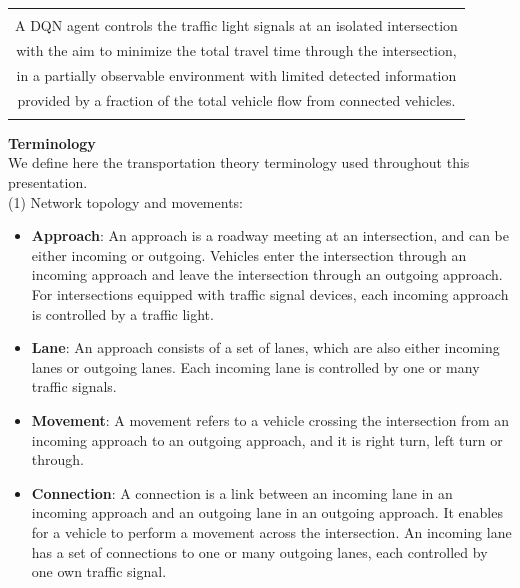 \begin{table}[htbp]
\centering
\setlength\tabcolsep{2pt}
\begin{tabular}{|c|}
\hline
\\
\:\:A DQN agent controls the traffic light signals at an isolated intersection\:\:\\
\:\:with the aim to minimize the total travel time through the intersection,\:\:\\
\:\:in a partially observable environment with limited detected information\:\:\\
\:\:provided by a fraction of the total vehicle flow from connected vehicles.\:\:\\
\\
\hline
\end{tabular}
\end{table}

\textbf{Terminology} \\
We define here the transportation theory terminology used throughout this presentation. \\

(1) Network topology and movements:
\begin{itemize}
\setlength\itemsep{-0.5em}
  \item \textbf{Approach}: An approach is a roadway meeting at an intersection, and can be either incoming or outgoing. Vehicles enter the intersection through an incoming approach and leave the intersection through an outgoing approach. For intersections equipped with traffic signal devices, each incoming approach is controlled by a traffic light.
  \item \textbf{Lane}: An approach consists of a set of lanes, which are also either incoming lanes or outgoing lanes. Each incoming lane is controlled by one or many traffic signals.
  \item \textbf{Movement}: A movement refers to a vehicle crossing the intersection from an incoming approach to an outgoing approach, and it is right turn, left turn or through.
  \item \textbf{Connection}: A connection is a link between an incoming lane in an incoming approach and an outgoing lane in an outgoing approach. It enables for a vehicle to perform a movement across the intersection. An incoming lane has a set of connections to one or many outgoing lanes, each controlled by one own traffic signal.
\end{itemize}

